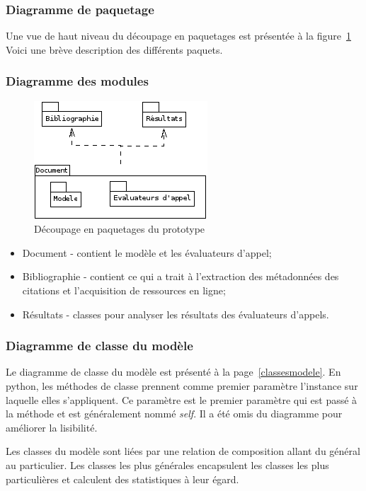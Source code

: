 \subsubsection{Diagramme de paquetage}
Une vue de haut niveau du découpage en paquetages est présentée à la figure~\ref{paquetages} Voici une brève description des différents paquets.

\subsubsection{Diagramme des modules}
\begin{figure}
    \centerline{\includegraphics{figures/diagramme-paquetage.png}}
    \caption{Découpage en paquetages du prototype}
    \label{paquetages}
\end{figure}
\begin{itemize}
    \item Document - contient le modèle et les évaluateurs d'appel;
    \item Bibliographie - contient ce qui a trait à l'extraction des métadonnées des citations et l'acquisition de ressources en ligne;
    \item Résultats - classes pour analyser les résultats des évaluateurs d'appels. 
\end{itemize}

\subsubsection{Diagramme de classe du modèle}
Le diagramme de classe du modèle est présenté à la page~\ref{classesmodele}. En python, les méthodes de classe prennent comme premier paramètre l'instance sur laquelle elles s'appliquent. Ce paramètre est le premier paramètre qui est passé à la méthode et est généralement nommé \emph{self}. Il a été omis du diagramme pour améliorer la lisibilité.

Les classes du modèle sont liées par une relation de composition allant du général au particulier. Les classes les plus générales encapsulent les classes les plus particulières et calculent des statistiques à leur égard.

